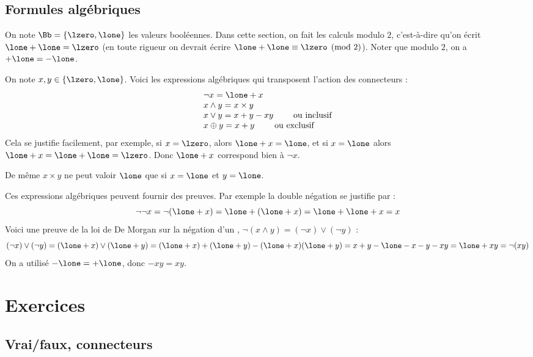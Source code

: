 \documentclass[11pt,class=report,crop=false]{standalone}
\begin{document}
\subsection{Formules algébriques}

On note $\Bb = \{ \lzero, \lone \}$ les valeurs booléennes. 
Dans cette section, on fait les calculs modulo $2$, c'est-à-dire qu'on écrit $\lone+\lone = \lzero$ (en toute rigueur on devrait écrire $\lone + \lone \equiv \lzero \pmod 2$).
Noter que modulo $2$, on a $+\lone = - \lone$.

On note $x,y \in \{ \lzero, \lone \}$.
Voici les expressions algébriques qui transposent l'action des connecteurs :
\[
\begin{array}{l}
\lnot x = \lone + x \\
x \land y = x \times y \\
x \lor y = x + y - xy \qquad \text{ ou inclusif}\\
x \oplus y = x + y \qquad \text{ ou exclusif }	
\end{array}
\]
Cela se justifie facilement, par exemple, si $x=\lzero$, alors $\lone+x=\lone$, et si $x=\lone$ alors $\lone+x=\lone+\lone=\lzero$. Donc $\lone+x$ correspond bien à $\lnot x$. 

De même $x \times y$ ne peut valoir $\lone$ que si $x=\lone$ et $y=\lone$.

\begin{exemple}
	Ces expressions algébriques peuvent fournir des preuves. 
	Par exemple la double négation se justifie par :
	\[
	\lnot \lnot x = \lnot(\lone + x) = \lone + (\lone +x) = \lone+\lone+x = x
	\]
	Voici une preuve de la loi de De Morgan sur la négation d'un \tand, $\lnot( x \land y ) = (\lnot x) \lor (\lnot y)$ :
	\[ (\lnot x) \lor (\lnot y)
	= (\lone+x) \lor (\lone +y) 
	= (\lone+x) + (\lone +y) - (\lone+x)(\lone +y)
	= x +y - \lone -x -y -xy
	= \lone + xy
	= \lnot(xy)
	\]
	On a utilisé $-\lone=+\lone$, donc $-xy=xy$.
\end{exemple}



\section*{Exercices}

\subsection*{Vrai/faux, connecteurs}
\end{document}
